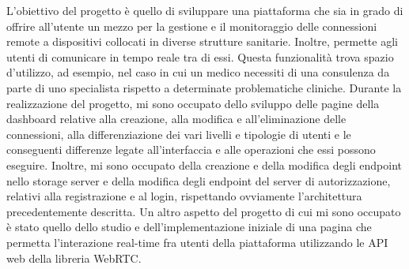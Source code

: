 L'obiettivo del progetto è quello di sviluppare una piattaforma che sia in grado di offrire all'utente un mezzo per la gestione e il monitoraggio delle connessioni remote a dispositivi collocati in diverse strutture sanitarie. Inoltre, permette agli utenti di comunicare in tempo reale tra di essi. Questa funzionalità trova spazio d'utilizzo, ad esempio, nel caso in cui un medico necessiti di una consulenza da parte di uno specialista rispetto a determinate problematiche cliniche. 
Durante la realizzazione del progetto, mi sono occupato dello sviluppo delle pagine della dashboard relative alla creazione, alla modifica e all'eliminazione delle connessioni,  alla differenziazione dei vari livelli e tipologie di utenti e le conseguenti differenze legate all'interfaccia e alle operazioni che essi possono eseguire. Inoltre, mi sono occupato della creazione e della modifica degli endpoint nello storage server e della modifica degli endpoint del server di autorizzazione, relativi alla registrazione e al login, rispettando ovviamente l'architettura precedentemente descritta.
\newline
Un altro aspetto del progetto di cui mi sono occupato è stato quello dello studio e dell'implementazione iniziale di una pagina che permetta l'interazione real-time fra utenti della piattaforma utilizzando le API web della libreria WebRTC.
